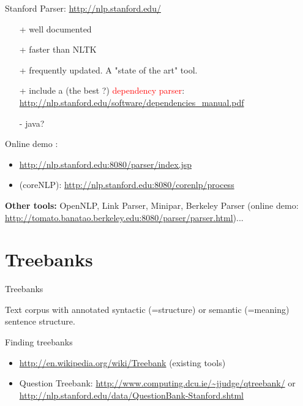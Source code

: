 \documentclass[10pt]{beamer}
\begin{document}

\begin{frame}

\begin{exampleblock}{Stanford Parser: \url{http://nlp.stanford.edu/}}
	\begin{itemize}
		\item[+] well documented
		\item[+] faster than NLTK
		\item[+] frequently updated. A "state of the art" tool.
		\item[+] include a (the best ?) \textcolor{red}{dependency parser}: \url{http://nlp.stanford.edu/software/dependencies_manual.pdf}
		\item[-] java?
	\end{itemize}
	
Online demo : 
	\begin{itemize}
		\item \url{http://nlp.stanford.edu:8080/parser/index.jsp}
		\item (coreNLP): \url{http://nlp.stanford.edu:8080/corenlp/process}
	\end{itemize}
\end{exampleblock}

\textbf{Other tools:} OpenNLP, Link Parser, Minipar, Berkeley Parser (online demo: \url{http://tomato.banatao.berkeley.edu:8080/parser/parser.html})...

\end{frame}


\section{Treebanks}

\begin{frame}{Treebanks}

Text corpus with annotated syntactic (=structure) or semantic (=meaning) sentence structure.

\begin{exampleblock}{Finding treebanks}
	\begin{itemize}
		\item \url{http://en.wikipedia.org/wiki/Treebank} (existing tools)
		\item Question Treebank: \url{http://www.computing.dcu.ie/~jjudge/qtreebank/} or \url{http://nlp.stanford.edu/data/QuestionBank-Stanford.shtml}
	\end{itemize}
\end{exampleblock}

\end{frame}
\end{document}

